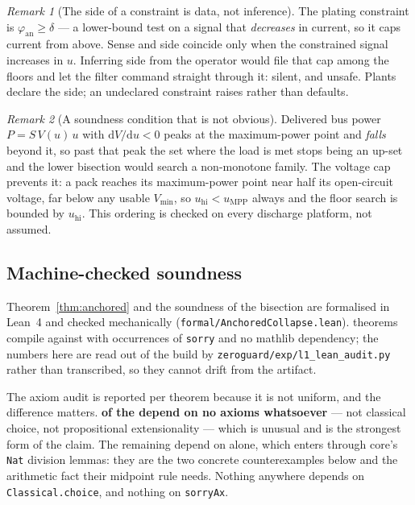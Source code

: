 \documentclass[11pt,letterpaper]{article}
\theoremstyle{definition}
\theoremstyle{remark}
\newtheorem{remark}{Remark}
\begin{document}
\begin{remark}[The side of a constraint is data, not inference]
The plating constraint is $\varphi_{\mathrm{an}} \ge \delta$ --- a lower-bound test on a signal
that \emph{decreases} in current, so it caps current from above. Sense and side coincide only
when the constrained signal increases in $u$. Inferring side from the operator would file that
cap among the floors and let the filter command straight through it: silent, and unsafe. Plants
declare the side; an undeclared constraint raises rather than defaults.
\end{remark}

\begin{remark}[A soundness condition that is not obvious]\label{rem:mpp}
Delivered bus power $P = S\,V(u)\,u$ with $\mathrm{d}V/\mathrm{d}u<0$ peaks at the maximum-power
point and \emph{falls} beyond it, so past that peak the set where the load is met stops being an
up-set and the lower bisection would search a non-monotone family. The voltage cap prevents it:
a pack reaches its maximum-power point near half its open-circuit voltage, far below any usable
$V_{\min}$, so $u_{\mathrm{hi}} < u_{\mathrm{MPP}}$ always and the floor search is bounded by
$u_{\mathrm{hi}}$. This ordering is checked on every discharge platform, not assumed.
\end{remark}

\subsection{Machine-checked soundness}\label{sec:formal}

Theorem~\ref{thm:anchored} and the soundness of the bisection are formalised in Lean~4 and
checked mechanically (\texttt{formal/AnchoredCollapse.lean}). \leanThms{} theorems compile
against \texttt{\leanToolchain} with \leanSorry{} occurrences of \texttt{sorry} and no mathlib
dependency; the numbers here are read out of the build by
\texttt{zeroguard/exp/l1\_lean\_audit.py} rather than transcribed, so they cannot drift from the
artifact.

The axiom audit is reported per theorem because it is not uniform, and the difference matters.
\textbf{\leanFreeWord{} of the \leanThms{} depend on no axioms whatsoever} --- not classical
choice, not propositional extensionality --- which is unusual and is the strongest form of the
claim. The remaining \leanUsing{} depend on \leanAxioms{} alone, which enters through core's
\texttt{Nat} division lemmas: they are the two concrete counterexamples below and the arithmetic
fact their midpoint rule needs. Nothing anywhere depends on \texttt{Classical.choice}, and
nothing on \texttt{sorryAx}.
\end{document}
